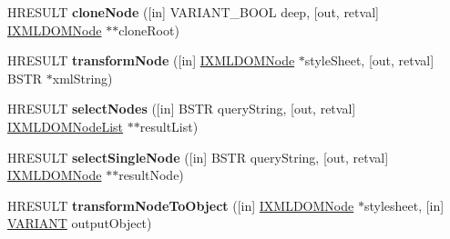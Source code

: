 \begin{DoxyCompactItemize}
\item 
\mbox{\label{interface_i_x_m_l_d_o_m_node_a52a667406662bdd1026383218e4176bd}} 
H\+R\+E\+S\+U\+LT {\bfseries clone\+Node} (\mbox{[}in\mbox{]} V\+A\+R\+I\+A\+N\+T\+\_\+\+B\+O\+OL deep, \mbox{[}out, retval\mbox{]} \hyperlink{interface_i_x_m_l_d_o_m_node}{I\+X\+M\+L\+D\+O\+M\+Node} $\ast$$\ast$clone\+Root)
\item 
\mbox{\label{interface_i_x_m_l_d_o_m_node_aa4b4f253cda3485d4b8a7bf61bd82111}} 
H\+R\+E\+S\+U\+LT {\bfseries transform\+Node} (\mbox{[}in\mbox{]} \hyperlink{interface_i_x_m_l_d_o_m_node}{I\+X\+M\+L\+D\+O\+M\+Node} $\ast$style\+Sheet, \mbox{[}out, retval\mbox{]} B\+S\+TR $\ast$xml\+String)
\item 
\mbox{\label{interface_i_x_m_l_d_o_m_node_a0bae0de8315ceb2a76c45148062c3a6c}} 
H\+R\+E\+S\+U\+LT {\bfseries select\+Nodes} (\mbox{[}in\mbox{]} B\+S\+TR query\+String, \mbox{[}out, retval\mbox{]} \hyperlink{interface_i_x_m_l_d_o_m_node_list}{I\+X\+M\+L\+D\+O\+M\+Node\+List} $\ast$$\ast$result\+List)
\item 
\mbox{\label{interface_i_x_m_l_d_o_m_node_a8aeb8bff7fa2c0f600d32380187f0133}} 
H\+R\+E\+S\+U\+LT {\bfseries select\+Single\+Node} (\mbox{[}in\mbox{]} B\+S\+TR query\+String, \mbox{[}out, retval\mbox{]} \hyperlink{interface_i_x_m_l_d_o_m_node}{I\+X\+M\+L\+D\+O\+M\+Node} $\ast$$\ast$result\+Node)
\item 
\mbox{\label{interface_i_x_m_l_d_o_m_node_af917af09fa88268f8dcf9b44f5d18a34}} 
H\+R\+E\+S\+U\+LT {\bfseries transform\+Node\+To\+Object} (\mbox{[}in\mbox{]} \hyperlink{interface_i_x_m_l_d_o_m_node}{I\+X\+M\+L\+D\+O\+M\+Node} $\ast$stylesheet, \mbox{[}in\mbox{]} \hyperlink{structtag_v_a_r_i_a_n_t}{V\+A\+R\+I\+A\+NT} output\+Object)
\end{DoxyCompactItemize}
